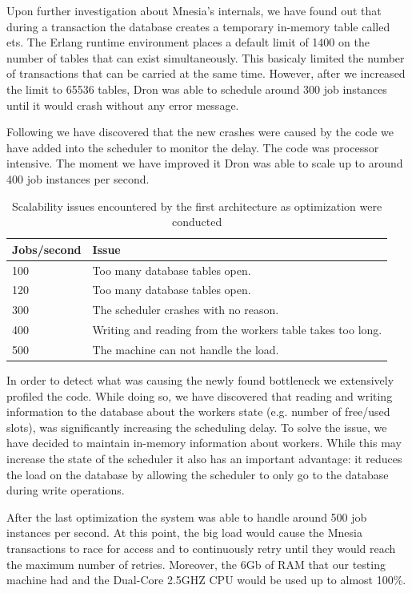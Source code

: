 \documentclass[11pt,a4paper,twoside]{report}
\begin{document}
Upon further investigation about Mnesia's internals, we have found out that during a transaction the database creates a temporary in-memory table called ets. The Erlang runtime environment places a default limit of 1400 on the number of tables that can exist simultaneously. This basicaly limited the number of transactions that can be carried at the same time. However, after we increased the limit to 65536 tables, Dron was able to schedule around 300 job instances until it would crash without any error message.


Following we have discovered that the new crashes were caused by the code we have added into the scheduler to monitor the delay. The code was processor intensive. The moment we have improved it Dron was able to scale up to around 400 job instances per second.


\begin{table}[h]
\centering
\begin{tabular}{|l|p{7.5cm}|}
\hline
\textbf{Jobs/second} & \textbf{Issue}\\ \hline
100 & Too many database tables open. \\ \hline
120 & Too many database tables open.\\ \hline
300 & The scheduler crashes with no reason.\\ \hline
400 & Writing and reading from the workers table takes too long.\\ \hline
500 & The machine can not handle the load.\\ \hline
\end{tabular}
\caption{Scalability issues encountered by the first architecture as optimization were conducted}
\label{tab:Dron1JI}
\end{table}


In order to detect what was causing the newly found bottleneck we extensively profiled the code. While doing so, we have discovered that reading and writing information to the database about the workers state (e.g. number of free/used slots), was significantly increasing the scheduling delay. To solve the issue, we have decided to maintain in-memory information about workers. While this may increase the state of the scheduler it also has an important advantage: it reduces the load on the database by allowing the scheduler to only go to the database during write operations. 


After the last optimization the system was able to handle around 500 job instances per second. At this point, the big load would cause the Mnesia transactions to race for access and to continuously retry until they would reach the maximum number of retries. Moreover, the 6Gb of RAM that our testing machine had and the Dual-Core 2.5GHZ CPU would be used up to almost 100\%.
\end{document}
